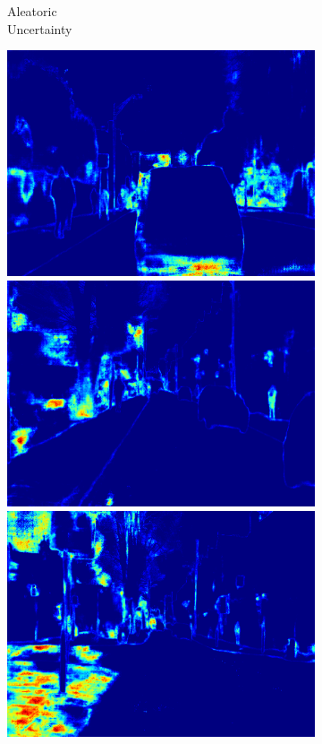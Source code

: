 \begin{figure}[t]
{\begin{subfigure}[t]{0.22\linewidth}
        \caption{Aleatoric\\Uncertainty}
    \end{subfigure}
    \begin{subfigure}[t]{0.22\linewidth}
        \centering
		\includegraphics[width=\linewidth]{segnet_1_output_5.png}
        \vspace{1px}
		\includegraphics[width=\linewidth]{segnet_13_output_5.png}
        \vspace{1px}
        \includegraphics[width=\linewidth]{segnet_2_output_5.png}

\end{subfigure}}
\end{figure}
